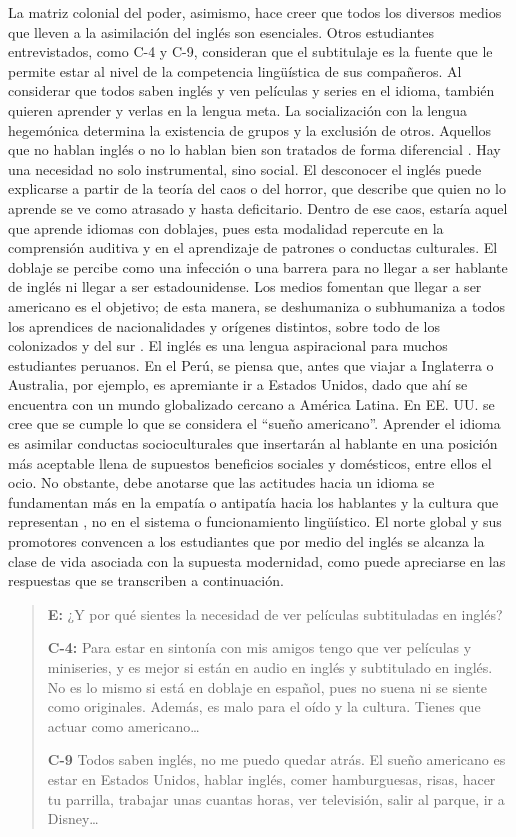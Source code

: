 \documentclass[spanish]{textolivre}
\newenvironment{MyQuote}{%
    \begin{myQuoteEnumerate}[resume=*,series=MyQuoteSeries]%
    \item \begin{quote}%
}{%
    \end{quote}%
    \end{myQuoteEnumerate}%
}%
\begin{document}
La matriz colonial del poder, asimismo, hace creer que todos los diversos medios que lleven a la asimilación del inglés son esenciales. Otros estudiantes entrevistados, como C-4 y C-9, consideran que el subtitulaje es la fuente que le permite estar al nivel de la competencia lingüística de sus compañeros. Al considerar que todos saben inglés y ven películas y series en el idioma, también quieren aprender y verlas en la lengua meta. La socialización con la lengua hegemónica determina la existencia de grupos y la exclusión de otros. Aquellos que no hablan inglés o no lo hablan bien son tratados de forma diferencial \cite{collins2018construccion}. Hay una necesidad no solo instrumental, sino social. El desconocer el inglés puede explicarse a partir de la teoría del caos o del horror, que describe que quien no lo aprende se ve como atrasado y hasta deficitario. Dentro de ese caos, estaría aquel que aprende idiomas con doblajes, pues esta modalidad repercute en la comprensión auditiva y en el aprendizaje de patrones o conductas culturales. El doblaje se percibe como una infección o una barrera para no llegar a ser hablante de inglés ni llegar a ser estadounidense. Los medios fomentan que llegar a ser americano es el objetivo; de esta manera, se deshumaniza o subhumaniza a todos los aprendices de nacionalidades y orígenes distintos, sobre todo de los colonizados y del sur \cite{mujica2019colonialidad}. El inglés es una lengua aspiracional para muchos estudiantes peruanos. En el Perú, se piensa que, antes que viajar a Inglaterra o Australia, por ejemplo, es apremiante ir a Estados Unidos, dado que ahí se encuentra con un mundo globalizado cercano a América Latina. En EE. UU. se cree que se cumple lo que se considera el “sueño americano”. Aprender el idioma es asimilar conductas socioculturales que insertarán al hablante en una posición más aceptable llena de supuestos beneficios sociales y domésticos, entre ellos el ocio. No obstante, debe anotarse que las actitudes hacia un idioma se fundamentan más en la empatía o antipatía hacia los hablantes y la cultura que representan \cite{munoz__actitudes_2019}, no en el sistema o funcionamiento lingüístico. El norte global y sus promotores convencen a los estudiantes que por medio del inglés se alcanza la clase de vida asociada con la supuesta modernidad, como puede apreciarse en las respuestas que se transcriben a continuación.

\begin{MyQuote}\label{myquote02}
\textbf{E:} ¿Y por qué sientes la necesidad de ver películas subtituladas en inglés?

\textbf{C-4:} Para estar en sintonía con mis amigos tengo que ver películas y miniseries, y es mejor si están en audio en inglés y subtitulado en inglés. No es lo mismo si está en doblaje en español, pues no suena ni se siente como originales. Además, es malo para el oído y la cultura. Tienes que actuar como americano…

\textbf{C-9} Todos saben inglés, no me puedo quedar atrás. El sueño americano es estar en Estados Unidos, hablar inglés, comer hamburguesas, risas, hacer tu parrilla, trabajar unas cuantas horas, ver televisión, salir al parque, ir a Disney…
\end{MyQuote}
\end{document}
